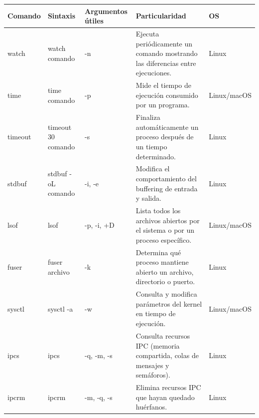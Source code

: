 \documentclass[a4paper,10pt]{article}
\begin{document}
\begin{longtable}{|p{2.8cm}|p{3.3cm}|p{4cm}|p{5.3cm}|p{1.5cm}|}

\hline
Comando &
Sintaxis &
Argumentos útiles &
Particularidad &
OS
\\
\hline
\endhead

watch &
watch comando &
-n &
Ejecuta periódicamente un comando mostrando las diferencias entre ejecuciones.
&
Linux
\\
\hline

time &
time comando &
-p &
Mide el tiempo de ejecución consumido por un programa.
&
Linux/macOS
\\
\hline

timeout &
timeout 30 comando &
-s &
Finaliza automáticamente un proceso después de un tiempo determinado.
&
Linux
\\
\hline

stdbuf &
stdbuf -oL comando &
-i, -e &
Modifica el comportamiento del buffering de entrada y salida.
&
Linux
\\
\hline

lsof &
lsof &
-p, -i, +D &
Lista todos los archivos abiertos por el sistema o por un proceso específico.
&
Linux/macOS
\\
\hline

fuser &
fuser archivo &
-k &
Determina qué proceso mantiene abierto un archivo, directorio o puerto.
&
Linux
\\
\hline

sysctl &
sysctl -a &
-w &
Consulta y modifica parámetros del kernel en tiempo de ejecución.
&
Linux/macOS
\\
\hline

ipcs &
ipcs &
-q, -m, -s &
Consulta recursos IPC (memoria compartida, colas de mensajes y semáforos).
&
Linux
\\
\hline

ipcrm &
ipcrm &
-m, -q, -s &
Elimina recursos IPC que hayan quedado huérfanos.
&
Linux
\\
\hline

\end{longtable}
\end{document}
